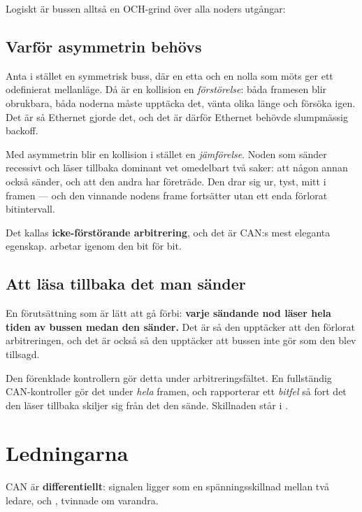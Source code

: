 Logiskt är bussen alltså en OCH-grind över alla noders utgångar:


\subsection{Varför asymmetrin behövs}

Anta i stället en symmetrisk buss, där en etta och en nolla som möts ger ett odefinierat
mellanläge. Då är en kollision en \emph{förstörelse}: båda framesen blir obrukbara, båda noderna
måste upptäcka det, vänta olika länge och försöka igen. Det är så Ethernet gjorde det, och det
är därför Ethernet behövde slumpmässig backoff.

Med asymmetrin blir en kollision i stället en \emph{jämförelse}. Noden som sänder recessivt och
läser tillbaka dominant vet omedelbart två saker: att någon annan också sänder, och att den
andra har företräde. Den drar sig ur, tyst, mitt i framen --- och den vinnande nodens frame fortsätter
utan ett enda förlorat bitintervall.

Det kallas \textbf{icke-förstörande arbitrering}, och det är CAN:s mest eleganta egenskap.
 arbetar igenom den bit för bit.

\subsection{Att läsa tillbaka det man sänder}

En förutsättning som är lätt att gå förbi: \textbf{varje sändande nod läser hela tiden av bussen
medan den sänder.} Det är så den upptäcker att den förlorat arbitreringen, och det är också så
den upptäcker att bussen inte gör som den blev tillsagd.

Den förenklade kontrollern gör detta under arbitreringsfältet. En fullständig CAN-kontroller gör
det under \emph{hela} framen, och rapporterar ett \emph{bitfel} så fort det den läser tillbaka
skiljer sig från det den sände. Skillnaden står i .

\section{Ledningarna}

CAN är \textbf{differentiellt}: signalen ligger som en spänningsskillnad mellan två ledare,
 och , tvinnade om varandra.

